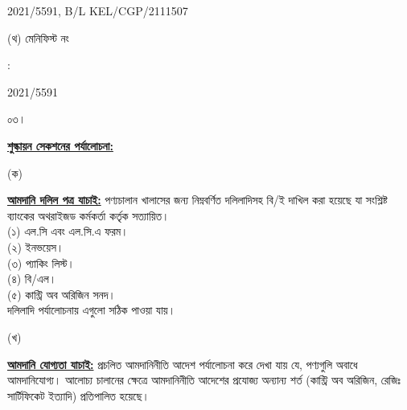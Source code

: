 \documentclass[12pt]{article}
\newcommand{\blno}{KEL/CGP/2111507}
\newcommand{\menifest}{2021/5591}
\begin{document}
\begin{minipage}[t]{0.53\linewidth}
{\menifest}, B/L {\blno}
\\
\end{minipage}
\begin{minipage}[t]{0.05\linewidth}
\hspace*{1em}
\end{minipage}
\begin{minipage}[t]{0.40\linewidth}
(থ) মেনিফিস্ট নং
\end{minipage}
\begin{minipage}[t]{0.02\linewidth}
:
\end{minipage}
\begin{minipage}[t]{0.53\linewidth}
{\menifest}
\\
\end{minipage}
\normalsize
\begin{minipage}[t]{0.05\linewidth}
০৩।
\end{minipage}
\begin{minipage}[t]{0.95\linewidth}
\underline{\textbf{শুল্কায়ন সেকশনের পর্যালোচনা:}}
\end{minipage}
\begin{minipage}[t]{0.05\linewidth}
\hspace{1em}
\end{minipage}
\begin{minipage}[t]{0.05\linewidth}
(ক)
\end{minipage}
\begin{minipage}[t]{0.90\linewidth}
\underline{\textbf{আমদানি দলিল পত্র যাচাই:}}
পণ্যচালান খালাসের জন্য নিম্নবর্ণিত দলিলাদিসহ বি/ই দাখিল করা
হয়েছে যা সংশ্লিষ্ট ব্যাংকের অথরাইজড কর্মকর্তা কর্তৃক সত্যায়িত।
\\
(১) এল.সি এবং এল.সি.এ ফরম।
\\
(২) ইনভয়েস।
\\
(৩) প্যাকিং লিস্ট।
\\
(৪) বি/এল।
\\
(৫) কান্ট্রি অব অরিজিন সনদ।
\\
দলিলাদি পর্যালোচনায় এগুলো
সঠিক পাওয়া যায়।
\\
\end{minipage}
\begin{minipage}[t]{0.05\linewidth}
\hspace{1em}
\end{minipage}
\begin{minipage}[t]{0.05\linewidth}
(খ)
\end{minipage}
\begin{minipage}[t]{0.90\linewidth}
\underline{\textbf{আমদানি যোগ্যতা যাচাই:}}
প্রচলিত আমদানিনীতি আদেশ পর্যালোচনা করে দেখা যায় যে, পণ্যগুলি অবাধে আমদানিযোগ্য।
আলোচ্য চালানের ক্ষেত্রে আমদানিনীতি আদেশের প্রযোজ্য অন্যান্য শর্ত (কান্ট্রি অব অরিজিন, রেজিঃ
সার্টিফিকেট ইত্যাদি) প্রতিপালিত হয়েছে।
\\
\end{minipage}
\end{document}
